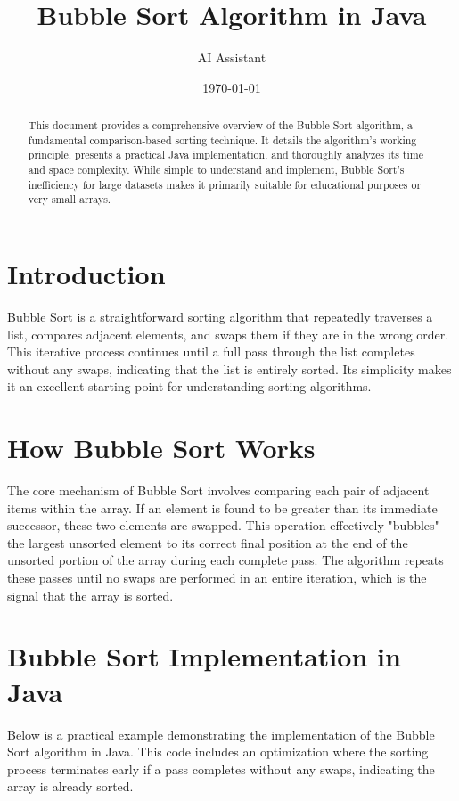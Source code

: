 \documentclass{article}
\title{Bubble Sort Algorithm in Java}
\author{AI Assistant} %
\date{\today} %
\begin{document}
\maketitle

\begin{abstract}
This document provides a comprehensive overview of the Bubble Sort algorithm, a fundamental comparison-based sorting technique. It details the algorithm's working principle, presents a practical Java implementation, and thoroughly analyzes its time and space complexity. While simple to understand and implement, Bubble Sort's inefficiency for large datasets makes it primarily suitable for educational purposes or very small arrays.
\end{abstract}

\section*{Introduction}
Bubble Sort is a straightforward sorting algorithm that repeatedly traverses a list, compares adjacent elements, and swaps them if they are in the wrong order. This iterative process continues until a full pass through the list completes without any swaps, indicating that the list is entirely sorted. Its simplicity makes it an excellent starting point for understanding sorting algorithms.

\section*{How Bubble Sort Works}
The core mechanism of Bubble Sort involves comparing each pair of adjacent items within the array. If an element is found to be greater than its immediate successor, these two elements are swapped. This operation effectively "bubbles" the largest unsorted element to its correct final position at the end of the unsorted portion of the array during each complete pass. The algorithm repeats these passes until no swaps are performed in an entire iteration, which is the signal that the array is sorted.

\section*{Bubble Sort Implementation in Java}
Below is a practical example demonstrating the implementation of the Bubble Sort algorithm in Java. This code includes an optimization where the sorting process terminates early if a pass completes without any swaps, indicating the array is already sorted.
\end{document}
